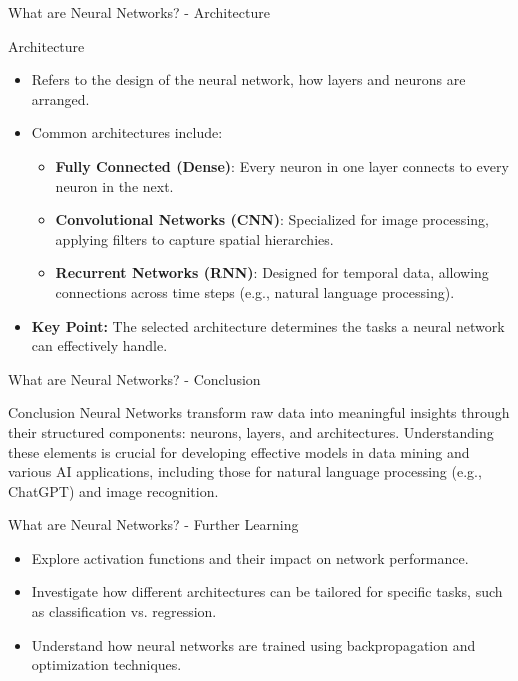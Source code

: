 \documentclass[aspectratio=169]{beamer}
\begin{document}
\begin{frame}[fragile]{What are Neural Networks? - Architecture}
    \begin{block}{Architecture}
        \begin{itemize}
            \item Refers to the design of the neural network, how layers and neurons are arranged.
            \item Common architectures include:
            \begin{itemize}
                \item \textbf{Fully Connected (Dense)}: Every neuron in one layer connects to every neuron in the next.
                \item \textbf{Convolutional Networks (CNN)}: Specialized for image processing, applying filters to capture spatial hierarchies.
                \item \textbf{Recurrent Networks (RNN)}: Designed for temporal data, allowing connections across time steps (e.g., natural language processing).
            \end{itemize}
            \item \textbf{Key Point:} The selected architecture determines the tasks a neural network can effectively handle.
        \end{itemize}
    \end{block}
\end{frame}

\begin{frame}[fragile]{What are Neural Networks? - Conclusion}
    \begin{block}{Conclusion}
        Neural Networks transform raw data into meaningful insights through their structured components: neurons, layers, and architectures. Understanding these elements is crucial for developing effective models in data mining and various AI applications, including those for natural language processing (e.g., ChatGPT) and image recognition.
    \end{block}
\end{frame}

\begin{frame}[fragile]{What are Neural Networks? - Further Learning}
    \begin{itemize}
        \item Explore activation functions and their impact on network performance.
        \item Investigate how different architectures can be tailored for specific tasks, such as classification vs. regression.
        \item Understand how neural networks are trained using backpropagation and optimization techniques.
    \end{itemize}
\end{frame}
\end{document}
